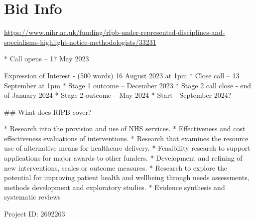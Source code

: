 \section{Bid Info}

\url{https://www.nihr.ac.uk/funding/rfpb-under-represented-disciplines-and-specialisms-highlight-notice-methodologists/33231}

\begin{markdown}

* Call opens – 17 May 2023    \item Expression of Interest - (500 words) 16 August 2023 at 1pm
* Close call – 13 September at 1pm
* Stage 1 outcome – December 2023
* Stage 2 call close - end of January 2024
* Stage 2 outcome – May 2024
* Start - September 2024?

## What does RfPB cover?

* Research into the provision and use of NHS services.
* Effectiveness and cost effectiveness evaluations of interventions.
* Research that examines the resource use of alternative means for healthcare delivery.
* Feasibility research to support applications for major awards to other funders.
* Development and refining of new interventions, scales or outcome measures.
*  Research to explore the potential for improving patient health and wellbeing through needs assessments, methods development and exploratory studies.
* Evidence synthesis and systematic reviews
\end{markdown}

Project ID: 2692263
